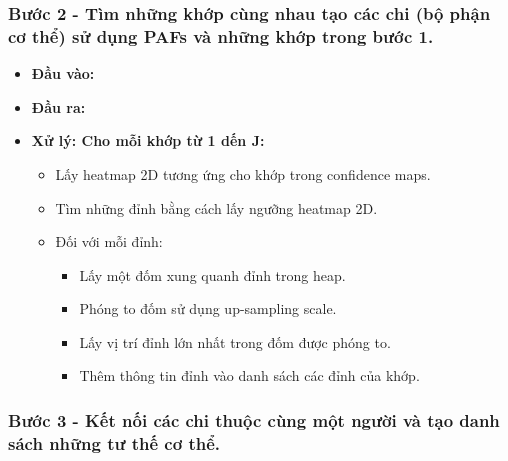 \subsubsection{Bước 2 - Tìm những khớp cùng nhau tạo các chi (bộ phận cơ thể) sử dụng PAFs và những khớp trong bước 1.}
\begin{itemize}
\item \textbf{Đầu vào:}

\item \textbf{Đầu ra: }
\item \textbf{Xử lý: Cho mỗi khớp từ 1 dến J:}
	\begin{itemize}
	\item Lấy heatmap 2D tương ứng cho khớp trong confidence maps.
	\item Tìm những đỉnh bằng cách lấy ngưỡng heatmap 2D.
	\item Đối với mỗi đỉnh:
		\begin{itemize}
		\item Lấy một đốm xung quanh đỉnh trong heap.
		\item Phóng to đốm sử dụng up-sampling scale.
		\item Lấy vị trí đỉnh lớn nhất trong đốm được phóng to.
		\item Thêm thông tin đỉnh vào danh sách các đỉnh của khớp.
		\end{itemize}
	\end{itemize}
\end{itemize}

\subsubsection{Bước 3 - Kết nối các chi thuộc cùng một người và tạo danh sách những tư thế cơ thể.}